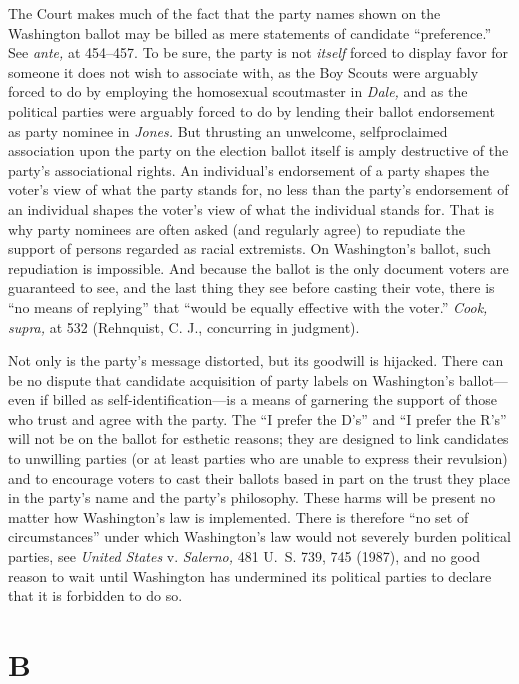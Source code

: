   The Court makes much of the fact that the party names shown on
the Washington ballot may be billed as mere statements of candidate
``preference.'' See \emph{ante,} at 454--457. To be sure, the party
is not \emph{itself} forced to display favor for someone it does not wish
to associate with, as the Boy Scouts \newpage  were arguably forced to
do by employing the homosexual scoutmaster in \emph{Dale,} and as the
political parties were arguably forced to do by lending their ballot
endorsement as party nominee in \emph{Jones.} But thrusting an unwelcome,
selfproclaimed association upon the party on the election ballot
itself is amply destructive of the party's associational rights. An
individual's endorsement of a party shapes the voter's view of
what the party stands for, no less than the party's endorsement of
an individual shapes the voter's view of what the individual stands
for. That is why party nominees are often asked (and regularly agree)
to repudiate the support of persons regarded as racial extremists. On
Washington's ballot, such repudiation is impossible. And because
the ballot is the only document voters are guaranteed to see, and the
last thing they see before casting their vote, there is ``no means
of replying'' that ``would be equally effective with the voter.''
\emph{Cook, supra,} at 532 (Rehnquist, C. J., concurring in judgment).

  Not only is the party's message distorted, but its goodwill
is hijacked. There can be no dispute that candidate acquisition
of party labels on Washington's ballot---even if billed as
self-identification---is a means of garnering the support of those who
trust and agree with the party. The ``I prefer the D's'' and ``I
prefer the R's'' will not be on the ballot for esthetic reasons;
they are designed to link candidates to unwilling parties (or at least
parties who are unable to express their revulsion) and to encourage
voters to cast their ballots based in part on the trust they place
in the party's name and the party's philosophy. These harms will
be present no matter how Washington's law is implemented. There is
therefore ``no set of circumstances'' under which Washington's law
would not severely burden political parties, see \emph{United States} v.
\emph{Salerno,} 481 U.~S. 739, 745 (1987), and no good reason to wait
until Washington has undermined its political parties to declare that it
is forbidden to do so. \newpage 

\section{B}


